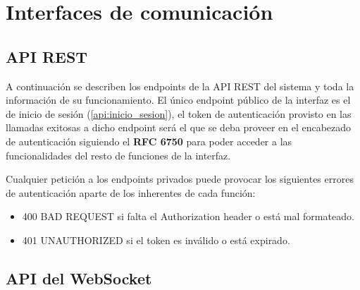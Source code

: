 \chapter{Interfaces de comunicación}
\label{ch:interfaces_comunicacion}

\section{API REST}

A continuación se describen los \glspl{endpoint} de la API REST del sistema y toda la información de su funcionamiento. El único \gls{endpoint} público de la interfaz es el de inicio de sesión (\ref{api:inicio_sesion}), el token de autenticación provisto en las llamadas exitosas a dicho \gls{endpoint} será el que se deba proveer en el encabezado de autenticación siguiendo el \textbf{RFC 6750}\cite{rfc6750} para poder acceder a las funcionalidades del resto de funciones de la interfaz.

Cualquier petición a los \glspl{endpoint} privados puede provocar los siguientes errores de autenticación aparte de los inherentes de cada función:

\begin{itemize}
    \item 400 BAD REQUEST si falta el Authorization header o está mal formateado.
    \item 401 UNAUTHORIZED si el \gls{token} es inválido o está expirado.
\end{itemize}

\vspace{-10pt}





\section{API del WebSocket}





